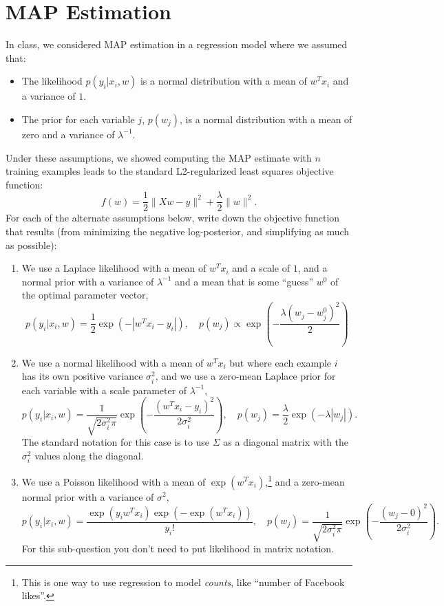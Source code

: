 \documentclass{article}
\def\blu#1{{\color{blu}#1}}
\def\norm#1{\|#1\|}
\def\items#1{\begin{itemize}#1\end{itemize}}
\def\enum#1{\begin{enumerate}#1\end{enumerate}}
\begin{document}
\section{MAP Estimation}

In class, we considered MAP estimation in a regression model where we assumed that:
\items{
\item The likelihood $p(y_i | x_i, w)$ is a normal distribution with a mean of $w^Tx_i$ and a variance of $1$.
\item The prior for each variable $j$, $p(w_j)$, is a normal distribution with a mean of zero and a variance of $\lambda^{-1}$.
}
Under these assumptions, we showed computing the MAP estimate with $n$ training examples leads to the standard L2-regularized least squares objective function:
\[
f(w) = \frac{1}{2}\norm{Xw - y}^2 + \frac \lambda 2 \norm{w}^2.
\]
\blu{For each of the alternate assumptions below, write down the objective function that results} (from minimizing the negative log-posterior, and simplifying as much as possible):
\enum{
\item We use a Laplace likelihood with a mean of $w^Tx_i$ and a scale of $1$, and a normal prior with a variance of $\lambda^{-1}$ and a mean that is some ``guess'' $w^0$ of the optimal parameter vector,
\[
p(y_i | x_i, w) = \frac 1 2 \exp(-|w^Tx_i - y_i|), \quad p(w_j) \propto \exp\left(-\frac{\lambda(w_j -  w^0_j)^2}{2}\right)
\]
\item We use a normal  likelihood with a mean of $w^Tx_i$ but where each example $i$ has its own  positive variance $\sigma_i^2$, and we use a zero-mean Laplace prior for each variable with a scale parameter of $\lambda^{-1}$,
\[
p(y_i | x_i,w) = \frac{1}{\sqrt{2\sigma_i^2\pi}}\exp\left(-\frac{(w^Tx_i - y_i)^2}{2\sigma_i^2}\right), \quad p(w_j) = \frac{\lambda}{2}\exp(-\lambda|w_j|).
\]
The standard notation for this case is to use $\Sigma$ as a diagonal matrix with the $\sigma_i^2$ values along the diagonal.
\item We use a Poisson likelihood with a mean of $\exp(w^Tx_i)$,\footnote{This is one way to use regression to model \emph{counts}, like ``number of Facebook likes''.} and a zero-mean normal prior with a variance of $\sigma^2$,
\[
p(y_i | x_i, w) = \frac{\exp(y_iw^Tx_i)\exp(-\exp(w^Tx_i))}{y_i!}, \quad p(w_j) = \frac{1}{\sqrt{2\sigma_i^2\pi}}\exp\left(-\frac{(w_j - 0)^2}{2\sigma_i^2}\right).
\]
For this sub-question you don't need to put likelihood in matrix notation.
}
\end{document}
